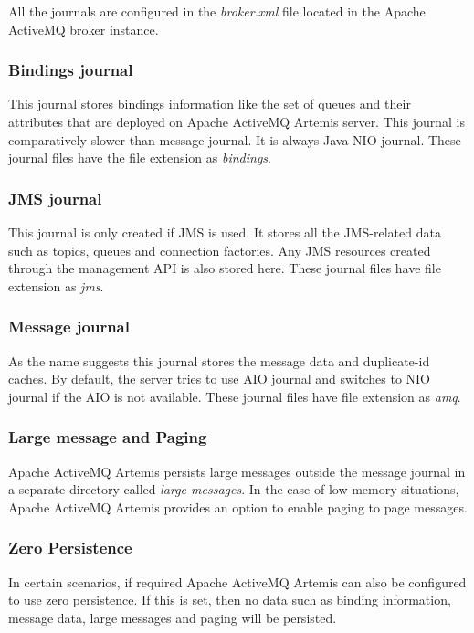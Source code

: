 All the journals are configured in the \textit{broker.xml} file located in the Apache ActiveMQ broker instance.

\subsubsection{Bindings journal}

This journal stores bindings information like the set of queues and their attributes that are deployed on Apache ActiveMQ Artemis server. This journal is comparatively slower than message journal. It is always Java NIO journal. These journal files have the file extension as \textit{bindings}.

\subsubsection{JMS journal}

This journal is only created if JMS is used. It stores all the JMS-related data such as topics, queues and connection factories. Any JMS resources created through the management API is also stored here. These journal files have file extension as \textit{jms}.

\subsubsection{Message journal}

As the name suggests this journal stores the message data and duplicate-id caches. By default, the server tries to use AIO journal and switches to NIO journal if the AIO is not available. These journal files have file extension as \textit{amq}.

\subsubsection{Large message and Paging}
Apache ActiveMQ Artemis persists large messages outside the message journal in a separate directory called \textit{large-messages}. In the case of low memory situations, Apache ActiveMQ Artemis provides an option to enable paging to page messages.

\subsubsection{Zero Persistence}

In certain scenarios, if required Apache ActiveMQ Artemis can also be configured to use zero persistence. If this is set, then no data such as binding information, message data, large messages and paging will be persisted. 